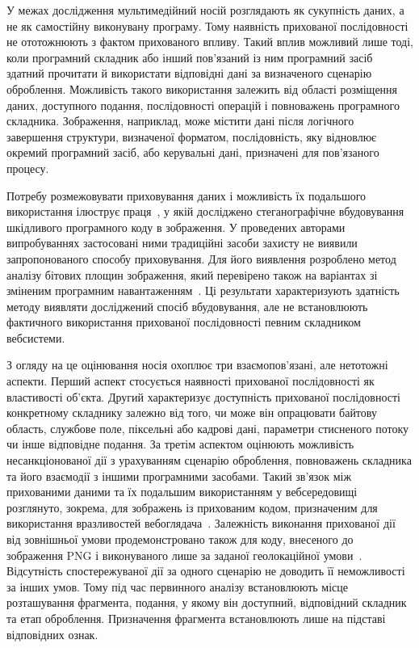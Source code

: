 У межах дослідження мультимедійний носій розглядають як сукупність даних, а не як самостійну виконувану програму. Тому наявність прихованої послідовності не ототожнюють з фактом прихованого впливу. Такий вплив можливий лише тоді, коли програмний складник або інший пов’язаний із ним програмний засіб здатний прочитати й використати відповідні дані за визначеного сценарію оброблення. Можливість такого використання залежить від області розміщення даних, доступного подання, послідовності операцій і повноважень програмного складника. Зображення, наприклад, може містити дані після логічного завершення структури, визначеної форматом, послідовність, яку відновлює окремий програмний засіб, або керувальні дані, призначені для пов’язаного процесу.

Потребу розмежовувати приховування даних і можливість їх подальшого використання ілюструє праця~\cite{kumagai2022malwareimage}, у якій досліджено стеганографічне вбудовування шкідливого програмного коду в зображення. У проведених авторами випробуваннях застосовані ними традиційні засоби захисту не виявили запропонованого способу приховування. Для його виявлення розроблено метод аналізу бітових площин зображення, який перевірено також на варіантах зі зміненим програмним навантаженням~\cite{kumagai2022malwareimage}. Ці результати характеризують здатність методу виявляти досліджений спосіб вбудовування, але не встановлюють фактичного використання прихованої послідовності певним складником вебсистеми.

З огляду на це оцінювання носія охоплює три взаємопов’язані, але нетотожні аспекти. Перший аспект стосується наявності прихованої послідовності як властивості об’єкта. Другий характеризує доступність прихованої послідовності конкретному складнику залежно від того, чи може він опрацювати байтову область, службове поле, піксельні або кадрові дані, параметри стисненого потоку чи інше відповідне подання. За третім аспектом оцінюють можливість несанкціонованої дії з урахуванням сценарію оброблення, повноважень складника та його взаємодії з іншими програмними засобами. Такий зв’язок між прихованими даними та їх подальшим використанням у вебсередовищі розглянуто, зокрема, для зображень із прихованим кодом, призначеним для використання вразливостей вебоглядача~\cite{iglesias2023driveby}. Залежність виконання прихованої дії від зовнішньої умови продемонстровано також для коду, внесеного до зображення PNG і виконуваного лише за заданої геолокаційної умови~\cite{almehmadi2022triggering}. Відсутність спостережуваної дії за одного сценарію не доводить її неможливості за інших умов. Тому під час первинного аналізу встановлюють місце розташування фрагмента, подання, у якому він доступний, відповідний складник та етап оброблення. Призначення фрагмента встановлюють лише на підставі відповідних ознак.


